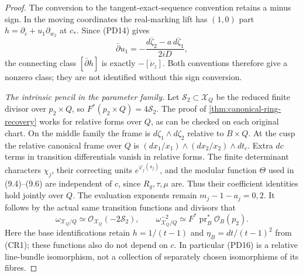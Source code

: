 \begin{proof}
The conversion to the tangent-exact-sequence convention retains a
minus sign. In the moving coordinates the real-marking lift has
$(1,0)$ part $h=\partial_c+u_1\partial_{w_2}$ at $c_*$.
Since (PD14) gives
\[
 \bar\partial u_1=-\frac{d\overline\zeta_2-a\,d\overline\zeta_1}{2iD},
\]
the connecting class $[\bar\partial h]$ is exactly $-[\dot\nu_z]$.
Both conventions therefore give a nonzero class; they are not identified
without this sign conversion.

\emph{The intrinsic pencil in the parameter family.}
Let $\mathcal S_2\subset\mathcal X_Q$ be the reduced finite divisor
over $p_2\times Q$, so $F^*(p_2\times Q)=4\mathcal S_2$.
The proof of \cref{thm:canonical-ring-recovery} works for relative
forms over $Q$, as can be checked on each original chart.
On the middle family the frame is $d\zeta_1\wedge d\zeta_2$ relative
to $B\times Q$. At the cusp the relative canonical frame over $Q$ is
$(dx_1/x_1)\wedge(dx_2/x_2)\wedge dt_c$.
Extra $dc$ terms in transition differentials vanish in relative forms.
The finite determinant characters $\chi_j$, their correcting units
$e^{\varphi_j(s_j)}$, and the modular function $\Theta$ used in
(9.4)--(9.6) are independent of $c$, since $R_g,\tau,\mu$ are.
Thus their coefficient identities hold jointly over $Q$.
The evaluation exponents remain $m_j-1-a_j=0,2$.
It follows by the actual same transition functions and divisors that
\[
 \omega_{\mathcal X_Q/Q}\simeq\mathcal O_{\mathcal X_Q}(-2\mathcal S_2),
 \qquad
 \omega_{\mathcal X_Q/Q}^{-2}\simeq
          F^*\operatorname{pr}_B^*\mathcal O_B(p_2).
 \tag{PD16}
\]
Here the base identifications retain $h=1/(t-1)$ and
$\eta_B=dt/(t-1)^2$ from (CR1); these functions also do not depend on $c$.
In particular (PD16) is a relative line-bundle isomorphism, not a
collection of separately chosen isomorphisms of its fibres.


\end{proof}
